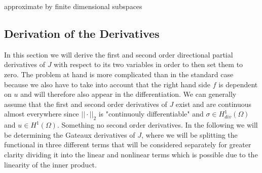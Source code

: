 \documentclass[fleqn, a4paper, 11pt, bibliography=totoc]{report}
\begin{document}
approximate by finite dimensional subspaces 

\subsection{Derivation of the Derivatives}

In this section we will derive the first and second order directional partial derivatives of $J$ with respect to its two variables in order to then set them to zero. The problem at hand is more complicated than in the standard case because we also have to take into account that the right hand side $f$ is dependent on $u$ and will therefore also appear in the differentiation. We can generally assume that the first and second order derivatives of $J$ exist and are continuous almost everywhere since $|| \cdot ||_2$ is "continuouly differentiable" and $\sigma \in H_{div}^1(\Omega)$ and $u \in H^1(\Omega)$. Something no second order derivatives. In the following we will be determining the Gateaux derivatives of $J$, where we will be splitting the functional in three different terms that will be considered separately for greater clarity dividing it into the linear and nonlinear terms which is possible due to the linearity of the inner product. 
\end{document}
